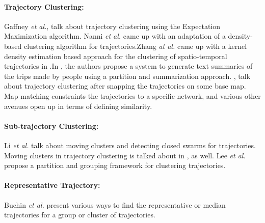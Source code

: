\paragraph{Trajectory Clustering:}
Gaffney \emph{et al.}\cite{gaffney1999trajectory},  talk about trajectory clustering using the Expectation Maximization algorithm. Nanni \emph{et al.} \cite{nanni2006time} came up with an adaptation of a density-based clustering algorithm for trajectories.Zhang \emph{at al.} came up with a kernel density estimation based approach for the clustering of spatio-temporal trajectories in \cite{Zhang}.In \cite{su2015making}, the authors propose a system to generate text summaries of the trips made by people using a partition and summarization approach. \cite{mapmatch1},\cite{mapmatch2} talk about trajectory clustering after snapping the trajectories on some base map. Map matching constraints the trajectories to a specific network, and various other avenues open up in terms of defining similarity.

\paragraph{Sub-trajectory Clustering:}
Li \emph{et al.}\cite{Li2010} talk about moving clusters and detecting closed swarms for trajectories. Moving clusters in trajectory clustering is talked about in \cite{flock1},\cite{flock2} as well. Lee \emph{et al.} \cite{Lee2007} propose a partition and grouping framework for clustering trajectories.

\paragraph{Representative Trajectory:}
Buchin \emph{et al.}\cite{median1} present various ways to find the representative or median trajectories for a group or cluster of trajectories.

